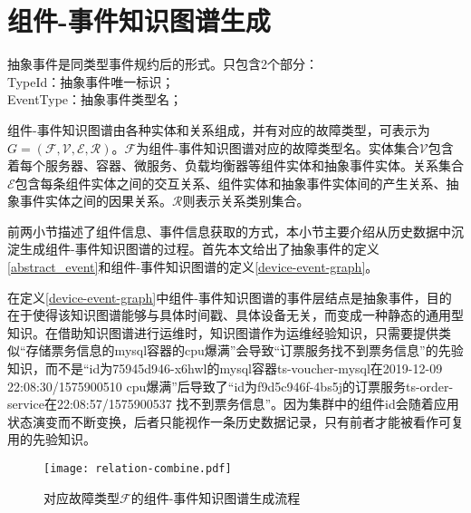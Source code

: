 \section{组件-事件知识图谱生成}\label{graph-generate}
\begin{definition}[抽象事件]
    抽象事件是同类型事件规约后的形式。只包含2个部分：
    \\TypeId：抽象事件唯一标识；
    \\EventType：抽象事件类型名；
    \label{abstract_event}
\end{definition}
\begin{definition}[组件-事件知识图谱]
    组件-事件知识图谱由各种实体和关系组成，并有对应的故障类型，可表示为$G=(\mathcal{F}, \mathcal{V}, \mathcal{E}, \mathcal{R})$。$\mathcal{F}$为组件-事件知识图谱对应的故障类型名。实体集合$\mathcal{V}$包含着每个服务器、容器、微服务、负载均衡器等组件实体和抽象事件实体。关系集合$\mathcal{E}$包含每条组件实体之间的交互关系、组件实体和抽象事件实体间的产生关系、抽象事件实体之间的因果关系。$\mathcal{R}$则表示关系类别集合。
    \label{device-event-graph}
\end{definition}

前两小节描述了组件信息、事件信息获取的方式，本小节主要介绍从历史数据中沉淀生成组件-事件知识图谱的过程。首先本文给出了抽象事件的定义\ref{abstract_event}和组件-事件知识图谱的定义\ref{device-event-graph}。

在定义\ref{device-event-graph}中组件-事件知识图谱的事件层结点是抽象事件，目的在于使得该知识图谱能够与具体时间戳、具体设备无关，而变成一种静态的通用型知识。在借助知识图谱进行运维时，知识图谱作为运维经验知识，只需要提供类似“存储票务信息的mysql容器的cpu爆满”会导致“订票服务找不到票务信息”的先验知识，而不是“id为75945d946-x6hwl的mysql容器ts-voucher-mysql在2019-12-09 22:08:30/1575900510 cpu爆满”后导致了“id为f9d5c946f-4bs5j的订票服务ts-order-service在22:08:57/1575900537 找不到票务信息”。因为集群中的组件id会随着应用状态演变而不断变换，后者只能视作一条历史数据记录，只有前者才能被看作可复用的先验知识。
\begin{figure}[htbp]
    \centering
    \texttt{[image: relation-combine.pdf]}
    \caption{对应故障类型$\mathcal{F}$的组件-事件知识图谱生成流程\label{relation-combine}}
\end{figure}

